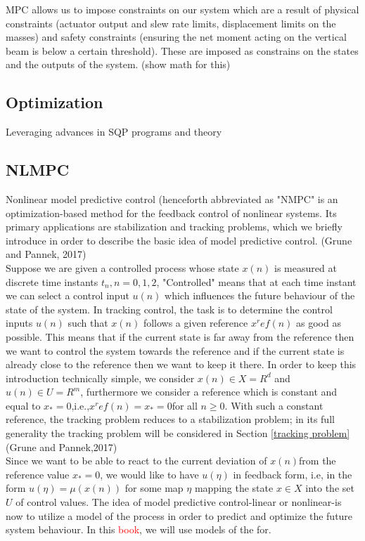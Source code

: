 \documentclass{UoNMCHA}
\numberwithin{equation}{section}
\begin{document}
MPC allows us to impose constraints on our system which are a result of physical constraints (actuator output and slew rate limits, displacement limits on the masses) and safety constraints (ensuring the net moment acting on the vertical beam is below a certain threshold). These are imposed as constrains on the states and the outputs of the system. (show math for this) 

\subsection*{Optimization}

Leveraging advances in SQP programs and theory 

\subsection*{NLMPC}

Nonlinear model predictive control (henceforth abbreviated as "NMPC"  is an optimization-based method for the feedback control of nonlinear systems. Its primary applications are stabilization and tracking problems, which we briefly introduce in order to describe the basic idea of model predictive control. (Grune and Pannek, 2017) \\

Suppose we are given a controlled process whose state $x(n)$ is measured at discrete time instants $t_n,n=0,1,2$, "Controlled" means that at each time instant we can select a control input $u(n)$ which 
influences the future behaviour of the state of the system. In tracking control, the task is to determine the control inputs $u(n)$ such that $x(n)$ follows a given reference $x^ref  (n)$ as good as possible. This means that if the current state is far away from the reference then we want to control the system towards the reference and if the current state is already close to the reference then we want to keep it there. In order to keep this introduction technically simple, we consider $x(n)\in X=R^d$ and $u(n)\in U=R^m$, furthermore we consider a reference which is constant and equal to $x_{*}=0$,i.e.,$x^ref (n)=x_{*}=0 $for all $n\geq 0$. With such a constant reference, the tracking problem reduces to a stabilization problem; in its full generality the tracking problem will be considered in Section \ref{tracking problem} (Grune and Pannek,2017) \\

Since we want to be able to react to the current deviation of $x(n)$from the reference value $x_{*}=0$, we would like to have $u(\eta)$ in feedback form, i.e, in the form $u(\eta)=\mu(x(n))$ for some map $\eta$ mapping the state $x \in X$ into the set $U$ of control values. The idea of model predictive control-linear or nonlinear-is now to utilize a model of the process in order to predict and optimize the future system behaviour. In this \textcolor{red}{book}, we will use models of the for.
\end{document}
